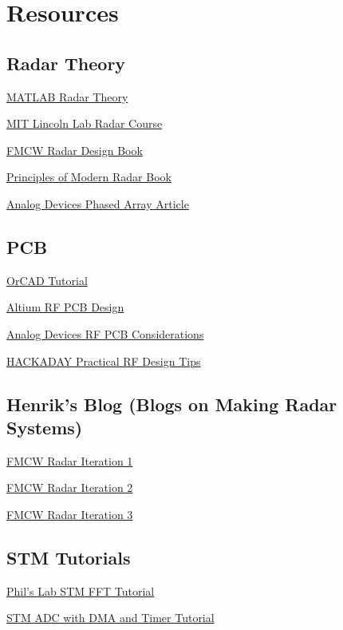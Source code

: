 \chapter{Resources
\label{Resources}}

\section{Radar Theory}

\href{https://www.youtube.com/watch?v=-N7A5CIi0sg&list=PLCxi4UK4mRdbROmUW_kQ_-ZOLfD5bonmM}{MATLAB Radar Theory}

\href{https://www.youtube.com/watch?v=q7yNQp_8Acg&list=PLNKgf4Cv_NZ1_fZt0bAJXAro6MlaTAEAU}{MIT Lincoln Lab Radar Course}

\href{https://www.amazon.com/Fmcw-Radar-Design-M-Jankiraman/dp/1630815675}{FMCW Radar Design Book}

\href{https://www.amazon.com/Principles-Modern-Radar-Basic/dp/1891121529}{Principles of Modern Radar Book}

\href{https://www.analog.com/en/resources/analog-dialogue/articles/phased-array-antenna-patterns-part1.html}{Analog Devices Phased Array Article}

\section{PCB}

\href{https://www.youtube.com/watch?v=pw-PG6-ofZY}{OrCAD Tutorial}

\href{https://www.youtube.com/watch?v=bVdwu1IoX4k&list=PL3aaAq2OJU5HGpEYy3Z0mRavamorHYKd3}{Altium RF PCB Design}

\href{https://www.youtube.com/watch?v=6jrVZu7eqiw&list=PLJg6l1DuoCo7MHCDhButMCtXnOHmwFqOI}{Analog Devices RF PCB Considerations}

\href{https://www.youtube.com/watch?v=TnRn3Kn_aXg&list=PLJg6l1DuoCo7MHCDhButMCtXnOHmwFqOI&index=2}{HACKADAY Practical RF Design Tips}

\section{Henrik's Blog (Blogs on Making Radar Systems)}

\href{https://hforsten.com/6-ghz-frequency-modulated-radar.html}{FMCW Radar Iteration 1}

\href{https://hforsten.com/homemade-synthetic-aperture-radar.html}{FMCW Radar Iteration 2}

\href{https://hforsten.com/third-version-of-homemade-6-ghz-fmcw-radar.html}{FMCW Radar Iteration 3}

\section{STM Tutorials}

\href{https://www.youtube.com/watch?v=d1KvgOwWvkM}{Phil's Lab STM FFT Tutorial}

\href{https://www.youtube.com/watch?v=r9UlXjrAOtc}{STM ADC with DMA and Timer Tutorial}